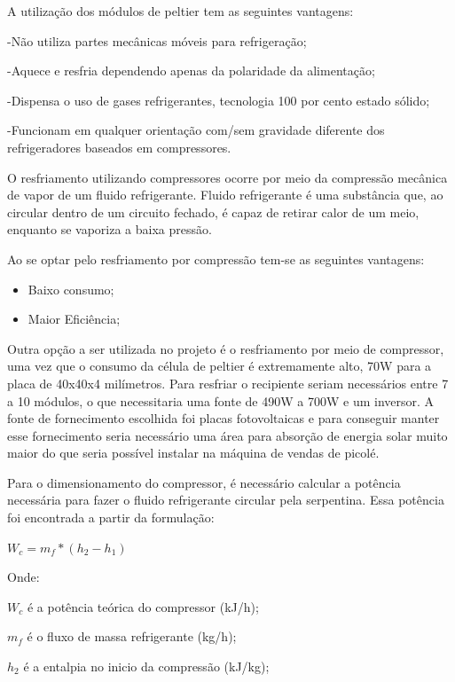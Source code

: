 A utilização dos módulos de peltier tem as seguintes vantagens:

-Não utiliza partes mecânicas móveis para refrigeração;

-Aquece e resfria dependendo apenas da polaridade da alimentação;

-Dispensa o uso de gases refrigerantes, tecnologia 100 por cento estado sólido;

-Funcionam em qualquer orientação com/sem gravidade diferente dos refrigeradores baseados em compressores.


O resfriamento utilizando compressores ocorre por meio da compressão mecânica de vapor de um fluido refrigerante. Fluido refrigerante é uma substância que, ao circular dentro de um circuito fechado, é capaz de retirar calor de um meio, enquanto se vaporiza a baixa pressão. \cite{teixeiraconcepccao}

Ao se optar pelo resfriamento por compressão tem-se as seguintes vantagens:

\begin{itemize}
\item Baixo consumo;

\item Maior Eficiência;
\end{itemize}


Outra opção a ser utilizada no projeto é o resfriamento por meio de compressor, uma vez que o consumo da célula de peltier é extremamente alto, 70W para a placa de 40x40x4 milímetros. Para resfriar o recipiente seriam necessários entre 7 a 10 módulos, o que necessitaria uma fonte de 490W a 700W e um inversor. A fonte de fornecimento escolhida foi placas fotovoltaicas e para conseguir manter esse fornecimento seria necessário uma área para absorção de energia solar muito maior do que seria possível instalar na máquina de vendas de picolé.


Para o dimensionamento do compressor, é necessário calcular a potência necessária para fazer o fluido refrigerante circular pela serpentina. Essa potência foi encontrada a
partir da formulação:

\begin{math} W_{c} = m_{f} * (h_{2} - h_{1})  \end{math}

Onde:

$W_{c}$ é a potência teórica do compressor (kJ/h);

$m_{f}$ é o fluxo de massa refrigerante (kg/h);

$h_{2}$ é a entalpia no inicio da compressão (kJ/kg);

